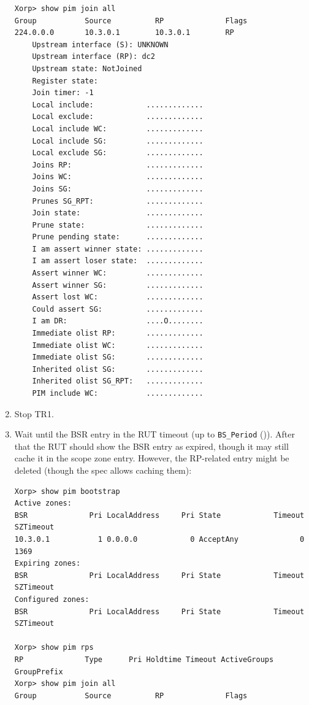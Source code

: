 \documentclass[11pt]{report}
\begin{document}
\begin{enumerate}
\begin{verbatim}
Xorp> show pim join all
Group           Source          RP              Flags
224.0.0.0       10.3.0.1        10.3.0.1        RP
    Upstream interface (S): UNKNOWN
    Upstream interface (RP): dc2
    Upstream state: NotJoined
    Register state:
    Join timer: -1
    Local include:            .............
    Local exclude:            .............
    Local include WC:         .............
    Local include SG:         .............
    Local exclude SG:         .............
    Joins RP:                 .............
    Joins WC:                 .............
    Joins SG:                 .............
    Prunes SG_RPT:            .............
    Join state:               .............
    Prune state:              .............
    Prune pending state:      .............
    I am assert winner state: .............
    I am assert loser state:  .............
    Assert winner WC:         .............
    Assert winner SG:         .............
    Assert lost WC:           .............
    Could assert SG:          .............
    I am DR:                  ....O........
    Immediate olist RP:       .............
    Immediate olist WC:       .............
    Immediate olist SG:       .............
    Inherited olist SG:       .............
    Inherited olist SG_RPT:   .............
    PIM include WC:           .............
\end{verbatim}

  \item Stop TR1.

  \item Wait until the BSR entry in the RUT timeout (up to \verb=BS_Period=
        ({\PimsmBSPeriod})). After that the RUT should show the BSR entry as
        expired, though it may still cache it in the scope zone entry.
        However, the RP-related entry might be deleted (though the spec
        allows caching them):

\begin{verbatim}
Xorp> show pim bootstrap
Active zones:
BSR              Pri LocalAddress     Pri State            Timeout SZTimeout
10.3.0.1           1 0.0.0.0            0 AcceptAny              0      1369
Expiring zones:
BSR              Pri LocalAddress     Pri State            Timeout SZTimeout
Configured zones:
BSR              Pri LocalAddress     Pri State            Timeout SZTimeout

Xorp> show pim rps
RP              Type      Pri Holdtime Timeout ActiveGroups GroupPrefix
Xorp> show pim join all
Group           Source          RP              Flags
\end{verbatim}


\end{enumerate}
\end{document}
